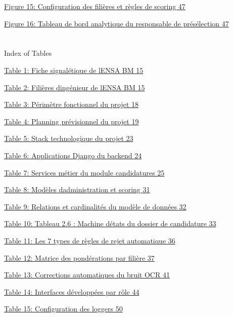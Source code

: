 \documentclass[
]{article}
\begin{document}
\protect\hyperlink{Figureux2114ux7csequence}{Figure 15: Configuration
des filières et règles de scoring 47}

\protect\hyperlink{Figureux2115ux7csequence}{Figure 16: Tableau de bord
analytique du responsable de présélection 47}

\hypertarget{section}{%
\section{}\label{section}}

Index of Tables

\protect\hyperlink{Tableux210ux7csequence}{Table 1: Fiche signalétique
de l\textquotesingle ENSA BM 15}

\protect\hyperlink{Tableux211ux7csequence}{Table 2: Filières
d\textquotesingle ingénieur de l\textquotesingle ENSA BM 15}

\protect\hyperlink{Tableux212ux7csequence}{Table 3: Périmètre
fonctionnel du projet 18}

\protect\hyperlink{Tableux213ux7csequence}{Table 4: Planning
prévisionnel du projet 19}

\protect\hyperlink{Tableux214ux7csequence}{Table 5: Stack technologique
du projet 23}

\protect\hyperlink{Tableux215ux7csequence}{Table 6: Applications Django
du backend 24}

\protect\hyperlink{Tableux216ux7csequence}{Table 7: Services métier du
module candidatures 25}

\protect\hyperlink{Tableux217ux7csequence}{Table 8: Modèles
d\textquotesingle administration et scoring 31}

\protect\hyperlink{Tableux218ux7csequence}{Table 9: Relations et
cardinalités du modèle de données 32}

\protect\hyperlink{Tableux219ux7csequence}{Table 10: Tableau 2.6 :
Machine d\textquotesingle états du dossier de candidature 33}

\protect\hyperlink{Tableux2110ux7csequence}{Table 11: Les 7 types de
règles de rejet automatique 36}

\protect\hyperlink{Tableux2111ux7csequence}{Table 12: Matrice des
pondérations par filière 37}

\protect\hyperlink{Tableux2112ux7csequence}{Table 13: Corrections
automatiques du bruit OCR 41}

\protect\hyperlink{Tableux2113ux7csequence}{Table 14: Interfaces
développées par rôle 44}

\protect\hyperlink{Tableux2114ux7csequence}{Table 15: Configuration des
loggers 50}
\end{document}
